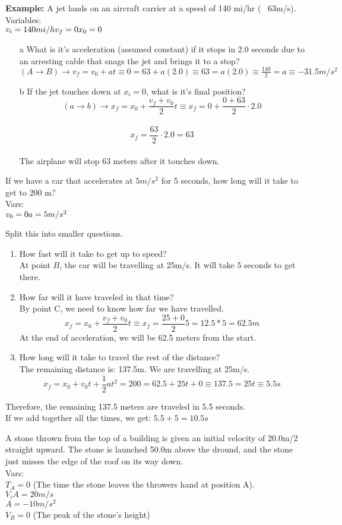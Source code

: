 \documentclass[]{article}
\begin{document}
\textbf{Example:} A jet lands on an aircraft carrier at a speed of 140 mi/hr (~ 63m/s).
Variables:\\
$v_i = 140mi/h\\v_f=0\\x_0=0$
\begin{enumerate}
	\item[a] What is it's acceleration (assumed constant) if it stops in 2.0 seconds due to an arresting cable that snags the jet and brings it to a stop?\\
		$(A\rightarrow B) \rightarrow v_f=v_0+at \equiv 0=63 + a(2.0) \equiv 63 = a(2.0) \equiv \frac{140}{2} = a \equiv -31.5m/s^2$
	\item[b] If the jet touches down at $x_i = 0$, what is it's final position?
		$$(a\rightarrow b)\rightarrow x_f=x_0+\frac{v_f+v_0}{2}t \equiv x_f = 0+\frac{0+63}{2} \cdot 2.0$$\\
		$$x_f = \frac{63}{2} \cdot 2.0 = 63$$\\
		The airplane will stop $63$ meters after it touches down.
\end{enumerate}
\newpage
If we have a car that accelerates at $5 m/s^2$ for 5 seconds, how long will it take to get to 200 m?\\
Vars:\\
$v_0 = 0\\
a = 5m/s^2$

Split this into smaller questions. 
\begin{enumerate}
	\item How fast will it take to get up to speed?\\
	At point $B$, the car will be travelling at 25m/s. It will take 5 seconds to get there.
	\item How far will it have traveled in that time?\\
	By point C, we need to know how far we have travelled.\\
	$$x_f = x_0+\frac{v_f+v_0}{2}t \equiv x_f = \frac{25 + 0}{2} 5 = 12.5 * 5 = 62.5m$$
	At the end of acceleration, we will be 62.5 meters from the start.
	\item How long will it take to travel the rest of the distance?\\
	The remaining distance is: 137.5m. We are travelling at 25m/s.
	$$x_f=x_0+v_0t+\frac{1}{2}at^2 = 200=62.5+25t+0 \equiv 137.5 = 25t \equiv 5.5s$$
\end{enumerate}
Therefore, the remaining 137.5 meters are traveled in 5.5 seconds.\\
If we add together all the times, we get: $5.5 + 5 = 10.5s$\newpage

A stone thrown from the top of a building is given an initial velocity of 20.0m/2 straight upward. The stone is launched 50.0m above the dround, and the stone just misses the edge of the roof on its way down.\\
Vars:\\
$T_A = 0$ (The time the stone leaves the throwers hand at position A).
$V_iA = 20m/s$\\
$A = -10m/s^2$\\
$V_B = 0$ (The peak of the stone's height)\\
\end{document}
